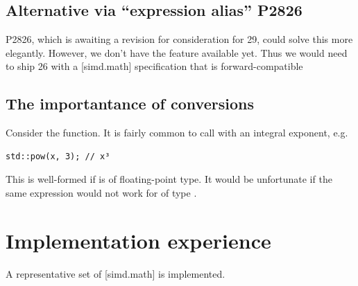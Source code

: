 \subsection{Alternative via “expression alias” P2826}

P2826, which is awaiting a revision for consideration for \CC{}29, could solve this more elegantly.
However, we don't have the feature available yet.
Thus we would need to ship \CC{}26 with a [simd.math] specification that is forward-compatible 

\subsection{The importantance of conversions}

Consider the  function.
It is fairly common to call  with an integral exponent, e.g.
\medskip\begin{lstlisting}[style=Vc]
std::pow(x, 3); // x³
\end{lstlisting}
This is well-formed if  is of floating-point type.
It would be unfortunate if the same expression would not work for  of type
.


\section{Implementation experience}
A representative set of [simd.math] is implemented.




